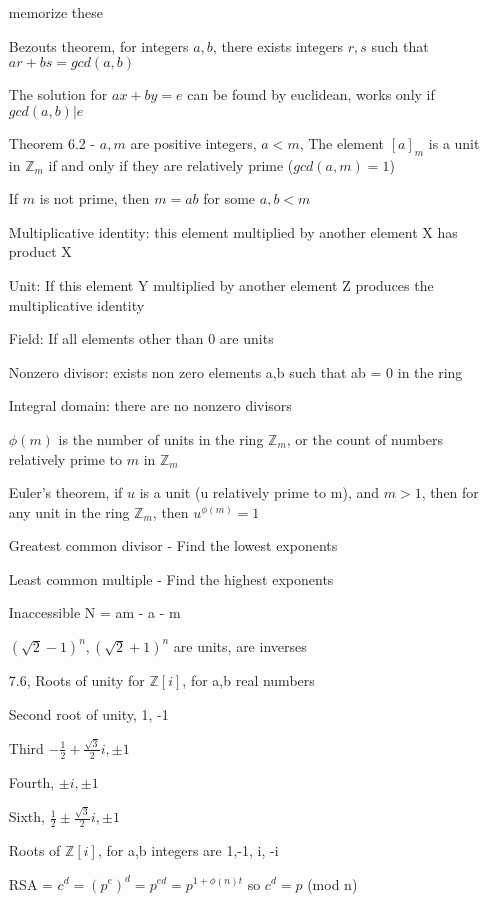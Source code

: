 \documentclass[11pt]{article}
\begin{document}
\begin{itemize}
\item[memorize these]

  Bezouts theorem, for integers $a,b$, there exists integers $r,s$ such that $ar + bs = gcd(a,b)$

  The solution for $ax + by = e$ can be found by euclidean, works only if $gcd(a,b) | e$

  Theorem 6.2 - $a,m$ are positive integers, $a<m$, The element $[a]_m$ is a unit in $\mathbb{Z}_m$ if and only if they are relatively prime ($gcd(a,m) = 1$)

  If $m$ is not prime, then $m = ab$ for some $a,b < m$

  Multiplicative identity: this element multiplied by another element X has product X

  Unit: If this element Y multiplied by another element Z produces the multiplicative identity

  Field: If all elements other than 0 are units

  Nonzero divisor: exists non zero elements a,b such that ab = 0 in the ring

  Integral domain: there are no nonzero divisors

  $\phi(m)$ is the number of units in the ring $\mathbb{Z}_m$, or the count of numbers relatively prime to $m$ in $\mathbb{Z}_m$

  Euler's theorem, if $u$ is a unit (u relatively prime to m), and $m > 1$, then for any unit in the ring $\mathbb{Z}_m$, then $u^{\phi(m)} = 1$

  Greatest common divisor - Find the lowest exponents

  Least common multiple - Find the highest exponents

  Inaccessible N = am - a - m

  $(\sqrt{2} - 1)^n,(\sqrt{2} + 1)^n$ are units, are inverses

  7.6, Roots of unity for $\mathbb{Z}[i]$, for a,b real numbers

  Second root of unity, 1, -1

  Third $-\frac{1}{2} + \frac{\sqrt{3}}{2}i, \pm 1$

  Fourth, $\pm i, \pm 1$

  Sixth, $\frac{1}{2} \pm \frac{\sqrt{3}}{2}i, \pm 1$

  Roots of $\mathbb{Z}[i]$, for a,b integers are 1,-1, i, -i

  RSA = $c^{d} = (p^{e})^d = p^{ed} = p^{1 + \phi(n)t}$ so $c^d = p$ (mod n)


\end{itemize}
\end{document}
